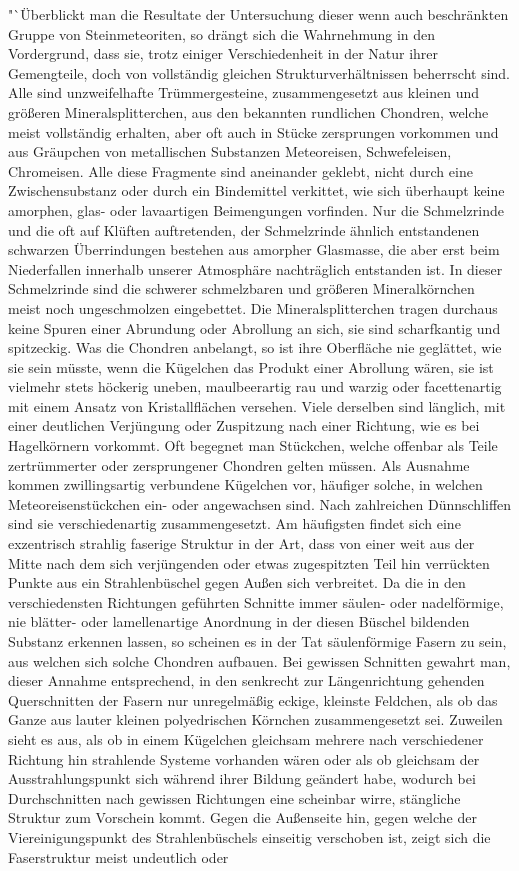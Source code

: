\documentclass[a4paper, 12pt, oneside]{article}
\begin{document}
"`Überblickt man die Resultate der Untersuchung dieser wenn auch beschränkten Gruppe von Steinmeteoriten, so drängt sich die Wahrnehmung in den Vordergrund, dass sie, trotz einiger Verschiedenheit in der Natur ihrer Gemengteile, doch von vollständig gleichen Strukturverhältnissen beherrscht sind. Alle sind unzweifelhafte Trümmergesteine, zusammengesetzt aus kleinen und größeren Mineralsplitterchen, aus den bekannten rundlichen Chondren, welche meist vollständig erhalten, aber oft auch in Stücke zersprungen vorkommen und aus Gräupchen von metallischen Substanzen Meteoreisen, Schwefeleisen, Chromeisen. Alle diese Fragmente sind aneinander geklebt, nicht durch eine Zwischensubstanz oder durch ein Bindemittel verkittet, wie sich überhaupt keine amorphen, glas- oder lavaartigen Beimengungen vorfinden. Nur die Schmelzrinde und die oft auf Klüften auftretenden, der Schmelzrinde ähnlich entstandenen schwarzen Überrindungen bestehen aus amorpher Glasmasse, die aber erst beim Niederfallen innerhalb unserer Atmosphäre nachträglich entstanden ist. In dieser Schmelzrinde sind die schwerer schmelzbaren und größeren Mineralkörnchen meist noch ungeschmolzen eingebettet. Die Mineralsplitterchen tragen durchaus keine Spuren einer Abrundung oder Abrollung an sich, sie sind scharfkantig und spitzeckig. Was die Chondren anbelangt, so ist ihre Oberfläche nie geglättet, wie sie sein müsste, wenn die Kügelchen das Produkt einer Abrollung wären, sie ist vielmehr stets höckerig uneben, maulbeerartig rau und warzig oder facettenartig mit einem Ansatz von Kristallflächen versehen. Viele derselben sind länglich, mit einer deutlichen Verjüngung oder Zuspitzung nach einer Richtung, wie es bei Hagelkörnern vorkommt. Oft begegnet man Stückchen, welche offenbar als Teile zertrümmerter oder zersprungener Chondren gelten müssen. Als Ausnahme kommen zwillingsartig verbundene Kügelchen vor, häufiger solche, in welchen Meteoreisenstückchen ein- oder angewachsen sind. Nach zahlreichen Dünnschliffen sind sie verschiedenartig zusammengesetzt. Am häufigsten findet sich eine exzentrisch strahlig faserige Struktur in der Art, dass von einer weit aus der Mitte nach dem sich verjüngenden oder etwas zugespitzten Teil hin verrückten Punkte aus ein Strahlenbüschel gegen Außen sich verbreitet. Da die in den verschiedensten Richtungen geführten Schnitte immer säulen- oder nadelförmige, nie blätter- oder lamellenartige Anordnung in der diesen Büschel bildenden Substanz erkennen lassen, so scheinen es in der Tat säulenförmige Fasern zu sein, aus welchen sich solche Chondren aufbauen. Bei gewissen Schnitten gewahrt man, dieser Annahme entsprechend, in den senkrecht zur Längenrichtung gehenden Querschnitten der Fasern nur unregelmäßig eckige, kleinste Feldchen, als ob das Ganze aus lauter kleinen polyedrischen Körnchen zusammengesetzt sei. Zuweilen sieht es aus, als ob in einem Kügelchen gleichsam mehrere nach verschiedener Richtung hin strahlende Systeme vorhanden wären oder als ob gleichsam der Ausstrahlungspunkt sich während ihrer Bildung geändert habe, wodurch bei Durchschnitten nach gewissen Richtungen eine scheinbar wirre, stängliche Struktur zum Vorschein kommt. Gegen die Außenseite hin, gegen welche der Viereinigungspunkt des Strahlenbüschels einseitig verschoben ist, zeigt sich die Faserstruktur meist undeutlich oder 
\end{document}

